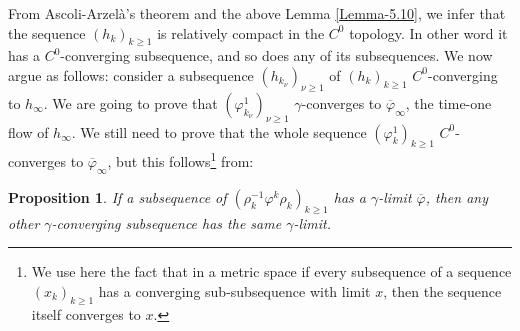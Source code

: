 \documentclass[JEP,XML,SOM,NoFloatCountersInSection,Unicode,published]{cedram}
\numberwithin{equation}{section}
\theoremstyle{plain}
\newtheorem{proposition}[theorem]{Proposition}
\theoremstyle{definition}
\theoremstyle{remark}
\begin{document}
From Ascoli-Arzelà's theorem and the above Lemma \ref{Lemma-5.10}, we infer that the sequence $({ h}_k)_{k\geq 1}$ is relatively compact in the $C^0$ topology. In other word it has a $C^0$-converging subsequence, and so does any of its subsequences. We now argue as follows: consider a subsequence $(h_{k_{\nu}})_{\nu \geq 1}$ of $({ h}_k)_{k\geq 1}$ $C^0$-converging to $h_{\infty}$. We are going to prove that $(\varphi^{1}_{k_{\nu}})_{\nu\geq 1}$ $\gamma$-converges to $\overline\varphi_{\infty}$, the time-one flow of $h_{\infty}$. We still need to prove that the whole sequence $(\varphi^{1}_{k})_{k \geq 1}$ $C^0$-converges to $\overline\varphi_{\infty}$, but this follows\footnote{We use here the fact that in a metric space if every subsequence of a sequence $(x_k)_{k\geq 1}$ has a converging sub-subsequence with limit $x$, then the sequence itself converges to $x$.} from:
\begin{proposition}\label{Prop-5.12}
If a subsequence of $(\rho_{k}^{-1} \varphi^{k}\rho_{k})_{k\geq 1}$ has a $\gamma$-limit $\overline \varphi$, then any other $\gamma$-converging subsequence has the same $\gamma$-limit.
\end{proposition}
\end{document}
